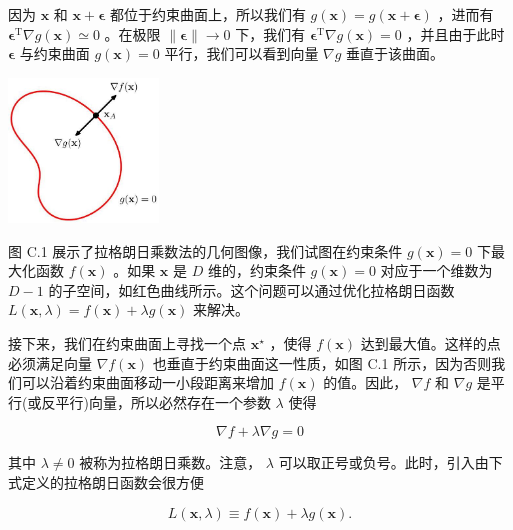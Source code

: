 \documentclass[10pt]{article}
\begin{document}
因为 \(\mathbf{x}\) 和 \(\mathbf{x} + \mathbf{\epsilon }\) 都位于约束曲面上，所以我们有 \(g\left( \mathbf{x}\right)  = g\left( {\mathbf{x} + \mathbf{\epsilon }}\right)\) ，进而有 \({\mathbf{\epsilon }}^{\mathrm{T}}\nabla g\left( \mathbf{x}\right)  \simeq  0\) 。在极限 \(\parallel \mathbf{\epsilon }\parallel  \rightarrow  0\) 下，我们有 \({\mathbf{\epsilon }}^{\mathrm{T}}\nabla g\left( \mathbf{x}\right)  = 0\) ，并且由于此时 \(\mathbf{\epsilon }\) 与约束曲面 \(g\left( \mathbf{x}\right)  = 0\) 平行，我们可以看到向量 \(\nabla g\) 垂直于该曲面。

\begin{center}
\includegraphics[max width=0.3\textwidth]{images/0194e279-9b28-703a-88f4-c3ac21e2010d_641_1087_344_461_443_0.jpg}
\end{center}
\hspace*{3em} 

图 C.1 展示了拉格朗日乘数法的几何图像，我们试图在约束条件 \(g\left( \mathbf{x}\right)  = 0\) 下最大化函数 \(f\left( \mathbf{x}\right)\) 。如果 \(\mathbf{x}\) 是 \(D\) 维的，约束条件 \(g\left( \mathbf{x}\right)  = 0\) 对应于一个维数为 \(D - 1\) 的子空间，如红色曲线所示。这个问题可以通过优化拉格朗日函数 \(L\left( {\mathbf{x},\lambda }\right)  = f\left( \mathbf{x}\right)  + {\lambda g}\left( \mathbf{x}\right)\) 来解决。

接下来，我们在约束曲面上寻找一个点 \({\mathbf{x}}^{ \star  }\) ，使得 \(f\left( \mathbf{x}\right)\) 达到最大值。这样的点必须满足向量 \(\nabla f\left( \mathbf{x}\right)\) 也垂直于约束曲面这一性质，如图 C.1 所示，因为否则我们可以沿着约束曲面移动一小段距离来增加 \(f\left( \mathbf{x}\right)\) 的值。因此， \(\nabla f\) 和 \(\nabla g\) 是平行(或反平行)向量，所以必然存在一个参数 \(\lambda\) 使得

\[
\nabla f + \lambda \nabla g = 0 \tag{C.3}
\]

其中 \(\lambda  \neq  0\) 被称为拉格朗日乘数。注意， \(\lambda\) 可以取正号或负号。此时，引入由下式定义的拉格朗日函数会很方便

\[
L\left( {\mathbf{x},\lambda }\right)  \equiv  f\left( \mathbf{x}\right)  + {\lambda g}\left( \mathbf{x}\right) . \tag{C.4}
\]
\end{document}
